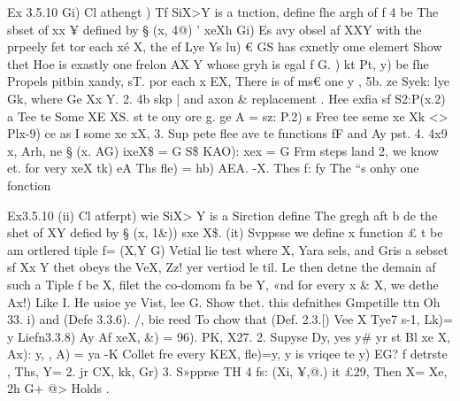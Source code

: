 \documentclass[a4paper,12pt]{article}
\begin{document}
\par

\vspace{10pt}

    Ex 3.5.10 Gi) Cl athengt )  Tf SiX>Y is a tnction, define fhe argh of f 4 be  The sbset of xx ¥ defined by § (x, 4@) ’ xeXh    Gi) Es avy obsel af XXY with the prpeely fet tor each xé X,  the ef Lye Ys lu) € GS has cxnetly ome elemert  Show thet Hoe is exastly one frelon AX Y whose gryh is egal f G.  ) kt Pt, y) be fhe Propels pitbin xandy, sT.  por each x EX, There is of ms€ one y , 5b.  ze Syek: lye Gk, where Ge Xx Y.    2. 4b skp | and axon \& replacement .  Hee exfia sf S2:P(x.2) a Tee te Some XE XS.  st te ony ore g.    ge A = sz: P.2) s Free tee seme xe Xk <> Plx-9) ce as I some xe xX,    3. Sup pete flee ave te functions fF and Ay pst. 4. 4x9 x, Arh, ne  § (x. AG) ixeX\$ = G  S\$ KAO): xex = G    Frm steps land 2, we know et. for very xeX tk) eA Ths fle) = hb)  AEA. -X.    Thes f: fy The “s onhy one fonction 

\vspace{10pt}

\par

\vspace{10pt}

    Ex3.5.10 (ii) Cl atferpt)  wie SiX> Y is a Sirction define The gregh aft b de  the shet of XY defied by § (x, 1\&)) sxe X\$.    (it) Svppsse we define x function £ t be am ortlered tiple f= (X,Y G) Vetial lie test  where X, Yara sels, and Gris a sebset sf Xx Y thet obeys the VeX, Zz! yer  vertiod le til. Le then detne the demain af such a Tiple f be X, filet  the co-domom fa be Y, «nd for every x \& X, we dethe Ax!) Like I.  He usioe ye Vist, lee G.   Show thet. this defnithes Gmpetille ttn Oh 33. i) and (Defe 3.3.6).    /, bie reed To chow that (Def. 2.3.[) Vee X Tye7 s-1, Lk)= y    Liefn3.3.8) Ay Af xeX, \&) = 96).  PK, X27.  2. Supyse Dy, yes y\# yr st Bl xe X, Ax): y, , A) = ya -K Collet  fre every KEX, fle)=y, y is vriqee te y) EG? f detrste ,  Ths, Y= 2.    jr CX, kk, Gr)    3. S»pprse TH 4 fs: (Xi, ¥,@.) it £29, Then X= Xe, 2h G+ @>  Holds . 

\vspace{10pt}

\par

\vspace{10pt}
\end{document}
